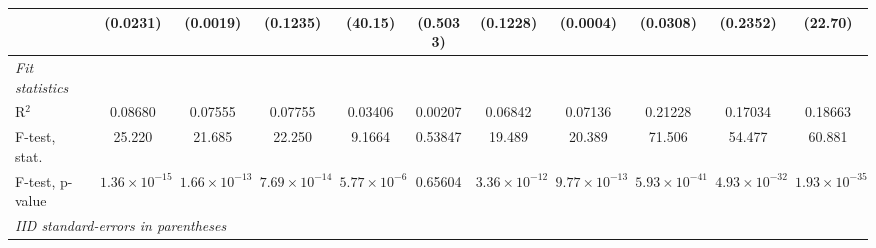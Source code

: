 \begin{tabular}{lcccccccccc}
                        & (0.0231)               & (0.0019)               & (0.1235)               & (40.15)               & (0.5033)          & (0.1228)               & (0.0004)               & (0.0308)               & (0.2352)               & (22.70)\\   
   \midrule
   \emph{Fit statistics}\\
   R$^2$                & 0.08680                & 0.07555                & 0.07755                & 0.03406               & 0.00207           & 0.06842                & 0.07136                & 0.21228                & 0.17034                & 0.18663\\  
   F-test, stat.        & 25.220                 & 21.685                 & 22.250                 & 9.1664                & 0.53847           & 19.489                 & 20.389                 & 71.506                 & 54.477                 & 60.881\\  
   F-test, p-value      & $1.36\times 10^{-15}$  & $1.66\times 10^{-13}$  & $7.69\times 10^{-14}$  & $5.77\times 10^{-6}$  & 0.65604           & $3.36\times 10^{-12}$  & $9.77\times 10^{-13}$  & $5.93\times 10^{-41}$  & $4.93\times 10^{-32}$  & $1.93\times 10^{-35}$\\   
   \midrule \midrule
   \multicolumn{11}{l}{\emph{IID standard-errors in parentheses}}\\
\end{tabular}
\par\endgroup


